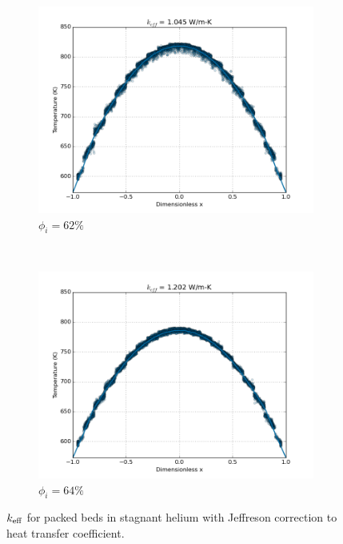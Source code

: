\begin{figure}[!ht]
    \centering
    \begin{subfigure}[b]{0.45\textwidth}
        \centering
        \includegraphics[width=\textwidth]{figures/initial_packing_study/keff-cfd-jeffreson-62.png}
        \caption{$\phi_i = 62\%$}
    \end{subfigure}
    ~
    \begin{subfigure}[b]{0.45\textwidth}
        \centering
        \includegraphics[width=\textwidth]{figures/initial_packing_study/keff-cfd-jeffreson-64.png}
        \caption{$\phi_i = 64\%$}
    \end{subfigure}
    \caption{$k_\text{eff}$ for packed beds in stagnant helium with Jeffreson correction to heat transfer coefficient.}
\label{fig:keff-cfd-initial-jeffreson}
\end{figure}

